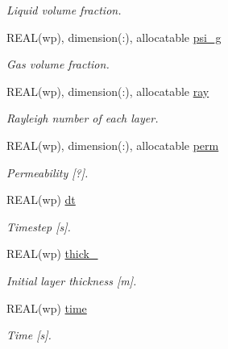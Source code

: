 \begin{DoxyCompactItemize}
\begin{DoxyCompactList}\small\item\em Liquid volume fraction. \item\end{DoxyCompactList}\item 
REAL(wp), dimension(:), allocatable \hyperlink{namespacemo__data_ab334544ada2f82dd312588426d1cfa64}{psi\_\-g}
\begin{DoxyCompactList}\small\item\em Gas volume fraction. \item\end{DoxyCompactList}\item 
REAL(wp), dimension(:), allocatable \hyperlink{namespacemo__data_a3ffdac0536a998149773806217f42543}{ray}
\begin{DoxyCompactList}\small\item\em Rayleigh number of each layer. \item\end{DoxyCompactList}\item 
REAL(wp), dimension(:), allocatable \hyperlink{namespacemo__data_ac629f6eccf4b77df3406ac2ad5ac8ea6}{perm}
\begin{DoxyCompactList}\small\item\em Permeability \mbox{[}?\mbox{]}. \item\end{DoxyCompactList}\item 
REAL(wp) \hyperlink{namespacemo__data_a6dedf87b47bcdf4151797c04485f251e}{dt}
\begin{DoxyCompactList}\small\item\em Timestep \mbox{[}s\mbox{]}. \item\end{DoxyCompactList}\item 
REAL(wp) \hyperlink{namespacemo__data_ad96d7ce134bb7b86325830161046d367}{thick\_}
\begin{DoxyCompactList}\small\item\em Initial layer thickness \mbox{[}m\mbox{]}. \item\end{DoxyCompactList}\item 
REAL(wp) \hyperlink{namespacemo__data_a9a0ee3e136f3b09016bfdffed837615a}{time}
\begin{DoxyCompactList}\small\item\em Time \mbox{[}s\mbox{]}. \item\end{DoxyCompactList}\item 

\end{DoxyCompactItemize}
